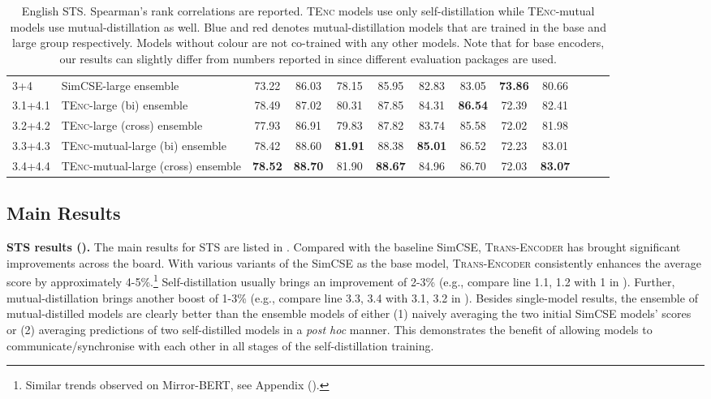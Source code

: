 \documentclass{article} \usepackage{iclr2021_conference,times}
\newcommand{\modelname}{\textsc{Trans-Encoder}\xspace}
\newcommand{\tenc}{\textsc{TEnc}\xspace}
\begin{document}
\begin{table}[!t]
\begin{tabular}{llccccccccccc}
\cmidrule[.5pt]{1-10}
3+4 &SimCSE-large ensemble & 73.22 & 86.03 & 78.15 & 85.95 & 82.83 & 83.05 & \textbf{73.86} & 80.66 \\
3.1+4.1 & \tenc-large (bi) ensemble & 78.49 & 87.02 & 80.31 & 87.85 & 84.31 & \textbf{86.54} & 72.39 & 82.41 \\
3.2+4.2 & \tenc-large (cross) ensemble & 77.93 & 86.91 & 79.83 & 87.82 & 83.74 & 85.58 & 72.02 & 81.98 \\
\rowcolor{red!5}
3.3+4.3 & \tenc-mutual-large (bi) ensemble & 78.42 & 88.60 & \textbf{81.91} & 88.38 & \textbf{85.01} & 86.52 & 72.23 & 83.01 \\
\rowcolor{red!5}
3.4+4.4 & \tenc-mutual-large (cross) ensemble & \textbf{78.52} & \textbf{88.70} & 81.90 & \textbf{88.67} & 84.96  & 86.70 & 72.03 & \textbf{83.07} \\
\cmidrule[1.5pt]{1-10}

\end{tabular}
\vspace{-1.0mm}
\caption{English STS. Spearman's  rank correlations are reported. \tenc models use only self-distillation while \tenc-mutual models use mutual-distillation as well. \colorbox{blue!10}{Blue} and \colorbox{red!10}{red} denotes mutual-distillation models that are trained in the \colorbox{blue!10}{base} and \colorbox{red!10}{large} group respectively. Models without colour are not co-trained with any other models. Note that for base encoders, our results can slightly differ from numbers reported in \citep{gao2021simcse} since different evaluation packages are used.}
\label{tab:sts}
\vspace{-2.0mm}
\end{table}

\subsection{Main Results}

\textbf{STS results ().} The main results for STS are listed in . Compared with the baseline SimCSE, \modelname has brought significant improvements across the board. With various variants of the SimCSE as the base model, \modelname consistently enhances the average score by approximately 4-5\%.\footnote{Similar trends observed on Mirror-BERT, see Appendix ().} Self-distillation usually brings an improvement of 2-3\% (e.g., compare line 1.1, 1.2 with 1 in ). Further, mutual-distillation brings another boost of 1-3\% (e.g., compare line 3.3, 3.4 with 3.1, 3.2 in ).
Besides single-model results, the ensemble of mutual-distilled models are clearly better than the ensemble models of either (1) naively averaging the two initial SimCSE models' scores or (2) averaging predictions of two self-distilled models in a \textit{post hoc} manner. This demonstrates the benefit of allowing models to communicate/synchronise with each other in all stages of the self-distillation training.
\end{document}

